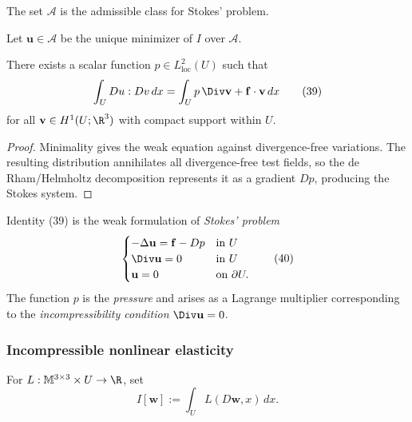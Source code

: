 \begin{definition}
\label{def:admissible-class-stokes-problem}
The set $\mathcal A$ is the admissible class for Stokes' problem.
\end{definition}

Let $\mathbf u\in\mathcal A$ be the unique minimizer of $I$ over $\mathcal A$.

\begin{theorem}
\label{thm:pressure-lagrange-multiplier-stokes}
There exists a scalar function $p \in L^2_{\text{loc}}(U)$ such that
\[
\int_U Du : Dv\, dx = \int_U p\, \Div \mathbf{v} + \mathbf{f}\cdot\mathbf{v}\, dx
\tag{39}
\]
for all $\mathbf{v} \in H^1(U;\R^3)$ with compact support within $U$.
\end{theorem}

\begin{proof}
\sketch Minimality gives the weak equation against divergence-free variations. The resulting distribution annihilates all divergence-free test fields, so the de Rham/Helmholtz decomposition represents it as a gradient $Dp$, producing the Stokes system.
\end{proof}

\begin{remark}
\label{rem:stokes-problem-weak-formulation}
Identity (39) is the weak formulation of \textit{Stokes' problem}
\[
\begin{cases}
-\Delta \mathbf{u} = \mathbf{f} - Dp & \text{in } U \\
\Div \mathbf{u} = 0 & \text{in } U \\
\mathbf{u} = 0 & \text{on } \partial U.
\end{cases}
\tag{40}
\]
The function $p$ is the \textit{pressure} and arises as a Lagrange multiplier corresponding to the \textit{incompressibility condition} $\Div \mathbf{u} = 0$.
\end{remark}

\subsubsection{Incompressible nonlinear elasticity}

For $L:\mathbb M^{3\times3}\times U\to\R$, set
\[
I[\mathbf w]:=\int_U L(D\mathbf w,x)\,dx.
\]

